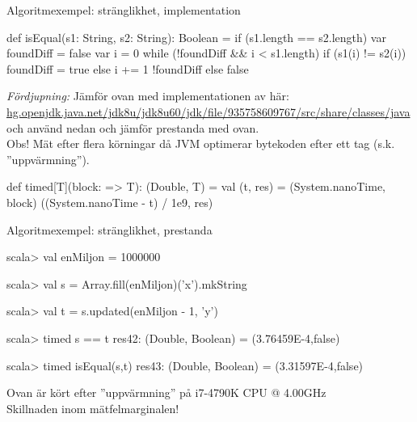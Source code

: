 \begin{Slide}{Algoritmexempel: stränglikhet, implementation}\SlideFontSmall
\begin{Code}
def isEqual(s1: String, s2: String): Boolean = {
  if (s1.length == s2.length) {
    var foundDiff = false
    var i = 0
    while (!foundDiff && i < s1.length) {
      if (s1(i) != s2(i)) foundDiff = true
      else i += 1
    }
    !foundDiff
  } else false
}
\end{Code}
\pause
{\SlideFontTiny \emph{Fördjupning:} Jämför ovan med implementationen av  här:\\
\href{http://hg.openjdk.java.net/jdk8u/jdk8u60/jdk/file/935758609767/src/share/classes/java/lang/String.java#l976}{hg.openjdk.java.net/jdk8u/jdk8u60/jdk/file/935758609767/src/share/classes/java} \\ och använd  nedan och jämför prestanda med  ovan.\\
Obs! Mät efter flera körningar då JVM optimerar bytekoden efter ett tag (s.k. ''uppvärmning'').}

\vspace{-0.25em}\begin{Code}
def timed[T](block: => T): (Double, T) = {
  val (t, res) = (System.nanoTime, block)
  ((System.nanoTime - t) / 1e9, res)
}
\end{Code}

\end{Slide}

\begin{Slide}{Algoritmexempel: stränglikhet, prestanda}
\begin{REPL}
scala> val enMiljon = 1000000

scala> val s = Array.fill(enMiljon)('x').mkString

scala> val t = s.updated(enMiljon - 1, 'y')

scala> timed { s == t }
res42: (Double, Boolean) = (3.76459E-4,false)

scala> timed { isEqual(s,t) }
res43: (Double, Boolean) = (3.31597E-4,false)
\end{REPL}
Ovan är kört efter ''uppvärmning'' på i7-4790K CPU @ 4.00GHz \\
Skillnaden inom mätfelmarginalen!
\end{Slide}



